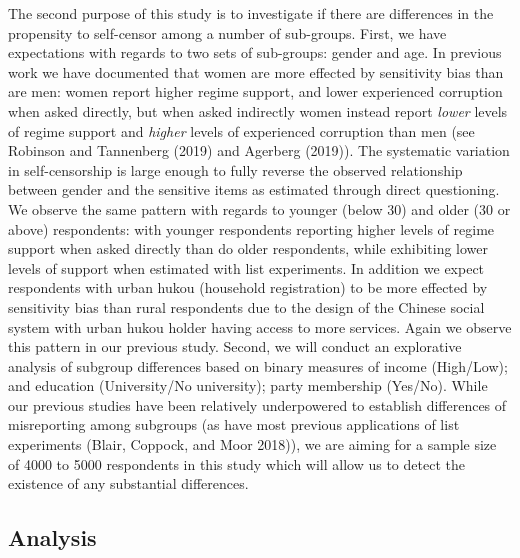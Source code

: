 \documentclass[]{article}
\begin{document}
The second purpose of this study is to investigate if there are
differences in the propensity to self-censor among a number of
sub-groups. First, we have expectations with regards to two sets of
sub-groups: gender and age. In previous work we have documented that
women are more effected by sensitivity bias than are men: women report
higher regime support, and lower experienced corruption when asked
directly, but when asked indirectly women instead report \emph{lower}
levels of regime support and \emph{higher} levels of experienced
corruption than men (see Robinson and Tannenberg (2019) and Agerberg
(2019)). The systematic variation in self-censorship is large enough to
fully reverse the observed relationship between gender and the sensitive
items as estimated through direct questioning. We observe the same
pattern with regards to younger (below 30) and older (30 or above)
respondents: with younger respondents reporting higher levels of regime
support when asked directly than do older respondents, while exhibiting
lower levels of support when estimated with list experiments. In
addition we expect respondents with urban hukou (household registration)
to be more effected by sensitivity bias than rural respondents due to
the design of the Chinese social system with urban hukou holder having
access to more services. Again we observe this pattern in our previous
study. Second, we will conduct an explorative analysis of subgroup
differences based on binary measures of income (High/Low); and education
(University/No university); party membership (Yes/No). While our
previous studies have been relatively underpowered to establish
differences of misreporting among subgroups (as have most previous
applications of list experiments (Blair, Coppock, and Moor 2018)), we
are aiming for a sample size of 4000 to 5000 respondents in this study
which will allow us to detect the existence of any substantial
differences.

\hypertarget{analysis}{%
\subsection{Analysis}\label{analysis}}
\end{document}
